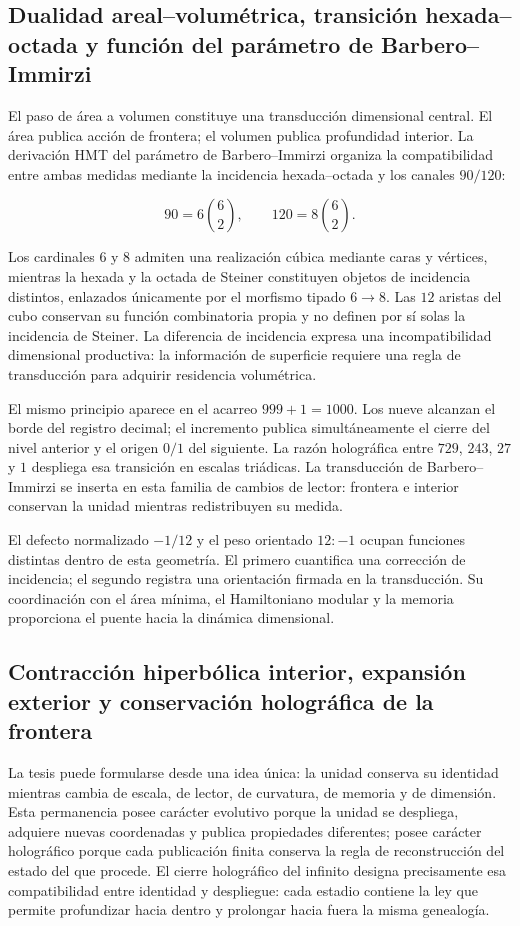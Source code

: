 \subsection{Dualidad areal--volumétrica, transición hexada--octada y función del parámetro de Barbero--Immirzi}

El paso de área a volumen constituye una transducción dimensional central. El área publica acción de frontera; el volumen publica profundidad interior. La derivación HMT del parámetro de Barbero–Immirzi organiza la compatibilidad entre ambas medidas mediante la incidencia hexada–octada y los canales \(90/120\):

\[
90=6\binom62,
\qquad
120=8\binom62.
\]

Los cardinales \(6\) y \(8\) admiten una realización cúbica mediante caras y vértices, mientras la hexada y la octada de Steiner constituyen objetos de incidencia distintos, enlazados únicamente por el morfismo tipado \(6\to8\). Las \(12\) aristas del cubo conservan su función combinatoria propia y no definen por sí solas la incidencia de Steiner. La diferencia de incidencia expresa una incompatibilidad dimensional productiva: la información de superficie requiere una regla de transducción para adquirir residencia volumétrica.

El mismo principio aparece en el acarreo \(999+1=1000\). Los nueve alcanzan el borde del registro decimal; el incremento publica simultáneamente el cierre del nivel anterior y el origen \(0/1\) del siguiente. La razón holográfica entre \(729\), \(243\), \(27\) y \(1\) despliega esa transición en escalas triádicas. La transducción de Barbero–Immirzi se inserta en esta familia de cambios de lector: frontera e interior conservan la unidad mientras redistribuyen su medida.

El defecto normalizado \(-1/12\) y el peso orientado \(12:-1\) ocupan funciones distintas dentro de esta geometría. El primero cuantifica una corrección de incidencia; el segundo registra una orientación firmada en la transducción. Su coordinación con el área mínima, el Hamiltoniano modular y la memoria proporciona el puente hacia la dinámica dimensional.

\subsection{Contracción hiperbólica interior, expansión exterior y conservación holográfica de la frontera}

La tesis puede formularse desde una idea única: la unidad conserva su identidad mientras cambia de escala, de lector, de curvatura, de memoria y de dimensión. Esta permanencia posee carácter evolutivo porque la unidad se despliega, adquiere nuevas coordenadas y publica propiedades diferentes; posee carácter holográfico porque cada publicación finita conserva la regla de reconstrucción del estado del que procede. El cierre holográfico del infinito designa precisamente esa compatibilidad entre identidad y despliegue: cada estadio contiene la ley que permite profundizar hacia dentro y prolongar hacia fuera la misma genealogía.

